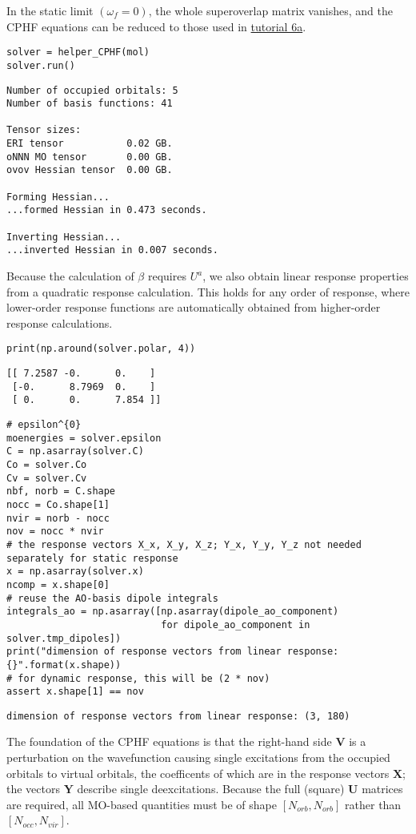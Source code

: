 In the static limit \((\omega_f = 0)\), the whole superoverlap matrix vanishes, and the CPHF equations can be reduced to those used in \href{https://github.com/psi4/psi4numpy/blob/066f378f26240a4802371ef32849230853581329/Tutorials/06_Molecular_Properties/6a_CP-SCF.ipynb}{tutorial 6a}.

\begin{verbatim}
solver = helper_CPHF(mol)
solver.run()
\end{verbatim}
\begin{verbatim}
Number of occupied orbitals: 5
Number of basis functions: 41

Tensor sizes:
ERI tensor           0.02 GB.
oNNN MO tensor       0.00 GB.
ovov Hessian tensor  0.00 GB.

Forming Hessian...
...formed Hessian in 0.473 seconds.

Inverting Hessian...
...inverted Hessian in 0.007 seconds.
\end{verbatim}
Because the calculation of \(\beta\) requires \(U^{a}\), we also obtain linear response properties from a quadratic response calculation. This holds for any order of response, where lower-order response functions are automatically obtained from higher-order response calculations.

\begin{verbatim}
print(np.around(solver.polar, 4))
\end{verbatim}
\begin{verbatim}
[[ 7.2587 -0.      0.    ]
 [-0.      8.7969  0.    ]
 [ 0.      0.      7.854 ]]
\end{verbatim}
\begin{verbatim}
# epsilon^{0}
moenergies = solver.epsilon
C = np.asarray(solver.C)
Co = solver.Co
Cv = solver.Cv
nbf, norb = C.shape
nocc = Co.shape[1]
nvir = norb - nocc
nov = nocc * nvir
# the response vectors X_x, X_y, X_z; Y_x, Y_y, Y_z not needed separately for static response
x = np.asarray(solver.x)
ncomp = x.shape[0]
# reuse the AO-basis dipole integrals
integrals_ao = np.asarray([np.asarray(dipole_ao_component)
                           for dipole_ao_component in solver.tmp_dipoles])
print("dimension of response vectors from linear response: {}".format(x.shape))
# for dynamic response, this will be (2 * nov)
assert x.shape[1] == nov
\end{verbatim}
\begin{verbatim}
dimension of response vectors from linear response: (3, 180)
\end{verbatim}
The foundation of the CPHF equations is that the right-hand side \(\mathbf{V}\) is a perturbation on the wavefunction causing single excitations from the occupied orbitals to virtual orbitals, the coefficents of which are in the response vectors \(\mathbf{X}\); the vectors \(\mathbf{Y}\) describe single deexcitations. Because the full (square) \(\mathbf{U}\) matrices are required, all MO-based quantities must be of shape \([N_{orb}, N_{orb}]\) rather than \([N_{occ}, N_{vir}]\).

